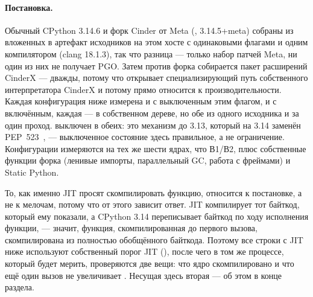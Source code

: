 
\paragraph{Постановка.} Обычный CPython 3.14.6 и форк Cinder от Meta (,
3.14.5+meta) собраны из вложенных в артефакт исходников на этом хосте с одинаковыми флагами
 и одним компилятором (clang 18.1.3), так что разница --- только набор патчей Meta,
ни один из них не получает PGO. Затем против форка собирается пакет расширений CinderX --- дважды,
потому что  открывает специализирующий путь собственного
интерпретатора CinderX и потому прямо относится к производительности. Каждая конфигурация ниже
измерена и с выключенным этим флагом, и с включённым, каждая --- в собственном дереве, но обе из
одного исходника и за один проход.
 выключен в обеих: это механизм до 3.13, который на 3.14 заменён
PEP~523~\cite{pep523}, --- выключенное состояние здесь правильное, а не ограничение. Конфигурации измеряются на
тех же шести ядрах, что В1/В2, плюс собственные функции форка (ленивые импорты, параллельный GC,
работа с фреймами) и Static Python.

То, как именно JIT просят скомпилировать функцию, относится к постановке, а не к мелочам, потому
что от этого зависит ответ. JIT компилирует тот байткод, который ему показали, а CPython 3.14
переписывает байткод по ходу исполнения функции, --- значит, функция, скомпилированная до первого
вызова, скомпилирована из полностью обобщённого байткода. Поэтому все строки с JIT ниже используют
собственный порог JIT (), после чего в том же процессе, который
будет мерить, проверяются две вещи: что ядро скомпилировано и что ещё один вызов не увеличивает
. Несущая здесь вторая --- об этом в конце раздела.

